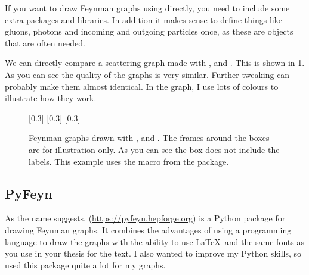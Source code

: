 If you want to draw Feynman graphs using \TikZ directly,
you need to include some extra \TikZ packages and libraries.
In addition it makes sense to
define things like gluons, photons and incoming and outgoing particles
once, as these are objects that are often needed.

We can directly compare a scattering graph made with
, \Package{\TikZ} and .
This is shown in \cref{fig:feyn:cf}.
As you can see the quality of the graphs is very similar.
Further tweaking can probably make them almost identical.
In the  graph, I use lots of colours to illustrate how they work.

\begin{figure}[htbp]
  \centering
    [0.3\textwidth]{
  }
  \subcaptionbox{\TikZ\label{fig:feyn:tikz}}
    [0.3\textwidth]{\fbox{%
    }
  }
    [0.3\textwidth]{}
  \caption{Feynman graphs drawn with , \Package{\TikZ} and .
    The frames around the boxes are for illustration only.
    As you can see the  box does not include the labels.
    This example uses the  macro from the  package.}%
  \label{fig:feyn:cf}
\end{figure}


\subsection{PyFeyn}%
\label{sec:fig:pyfeyn}

As the name suggests,  (\url{https://pyfeyn.hepforge.org})
is a Python package for drawing Feynman graphs.
It combines the advantages of using a programming language to draw the graphs
with the ability to use \LaTeX\ and the same fonts as you use in your thesis for the text.
I also wanted to improve my Python skills, so used this package quite a lot for my graphs.

